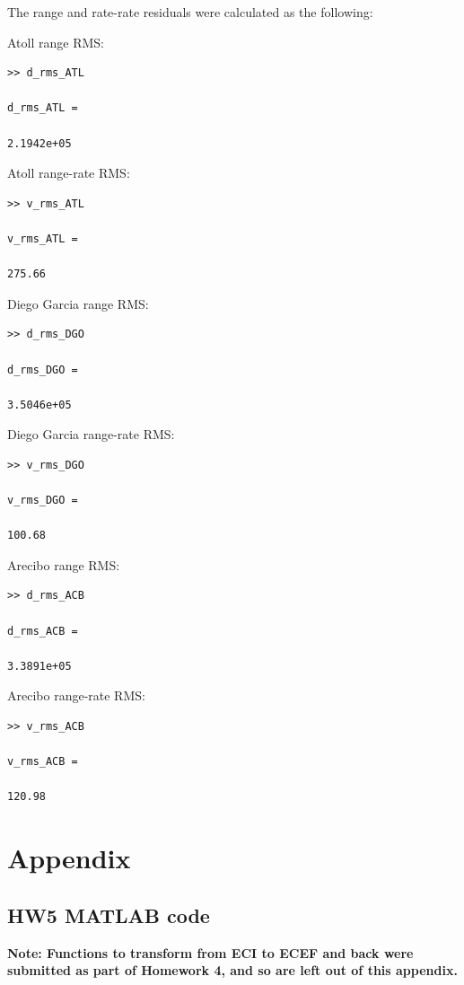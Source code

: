 \documentclass[conf]{new-aiaa}
\begin{document}
The range and rate-rate residuals were calculated as the following: 

Atoll range RMS: 
\begin{lstlisting}
>> d_rms_ATL

d_rms_ATL =

2.1942e+05
\end{lstlisting}

Atoll range-rate RMS: 
\begin{lstlisting}
>> v_rms_ATL

v_rms_ATL =

275.66
\end{lstlisting}

Diego Garcia range RMS: 
\begin{lstlisting}
>> d_rms_DGO

d_rms_DGO =

3.5046e+05
\end{lstlisting}

Diego Garcia range-rate RMS: 
\begin{lstlisting}
>> v_rms_DGO

v_rms_DGO =

100.68
\end{lstlisting}

Arecibo range RMS: 
\begin{lstlisting}
>> d_rms_ACB

d_rms_ACB =

3.3891e+05
\end{lstlisting}

Arecibo range-rate RMS: 
\begin{lstlisting}
>> v_rms_ACB

v_rms_ACB =

120.98
\end{lstlisting}


\newpage
\section*{Appendix} 

\subsection*{HW5 MATLAB code} 

\textbf{Note: Functions to transform from ECI to ECEF and back were submitted as part of Homework 4, and so are left out of this appendix.}
\end{document}
